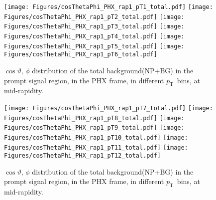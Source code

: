 \documentclass[12pt]{article}
\newcommand{\pt}{$p_{\mathrm{T}}$}
\begin{document}
%
%

\begin{figure}[htbp]
\centering
\texttt{[image: Figures/cosThetaPhi\_PHX\_rap1\_pT1\_total.pdf]}
\texttt{[image: Figures/cosThetaPhi\_PHX\_rap1\_pT2\_total.pdf]}
\texttt{[image: Figures/cosThetaPhi\_PHX\_rap1\_pT3\_total.pdf]}
\texttt{[image: Figures/cosThetaPhi\_PHX\_rap1\_pT4\_total.pdf]}
\texttt{[image: Figures/cosThetaPhi\_PHX\_rap1\_pT5\_total.pdf]}
\texttt{[image: Figures/cosThetaPhi\_PHX\_rap1\_pT6\_total.pdf]}
\caption{$\cos\vartheta,\,\phi$ distribution of the total background(NP+BG) in the prompt signal region, 
	in the PHX frame, in different \pt\ bins, at mid-rapidity.}
\end{figure}
\clearpage

\begin{figure}[htbp]
\centering
\texttt{[image: Figures/cosThetaPhi\_PHX\_rap1\_pT7\_total.pdf]}
\texttt{[image: Figures/cosThetaPhi\_PHX\_rap1\_pT8\_total.pdf]}
\texttt{[image: Figures/cosThetaPhi\_PHX\_rap1\_pT9\_total.pdf]}
\texttt{[image: Figures/cosThetaPhi\_PHX\_rap1\_pT10\_total.pdf]}
\texttt{[image: Figures/cosThetaPhi\_PHX\_rap1\_pT11\_total.pdf]}
\texttt{[image: Figures/cosThetaPhi\_PHX\_rap1\_pT12\_total.pdf]}
\caption{$\cos\vartheta,\,\phi$ distribution of the total background(NP+BG) in the prompt signal region, 
	in the PHX frame, in different \pt\ bins, at mid-rapidity.}
\end{figure}
\clearpage
\end{document}
